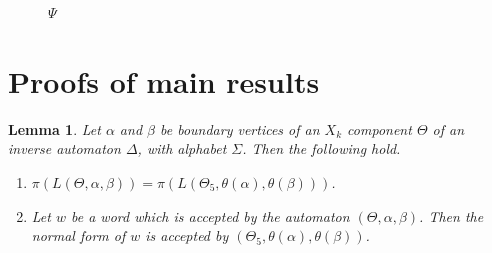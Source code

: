 \documentclass[a4paper,12pt]{article}
\renewcommand{\a}{\alpha }
\renewcommand{\b}{\beta }
\newcommand{\D}{\Delta }
\newcommand{\T}{\Theta }
\renewcommand{\S}{\Sigma }
\newtheorem{lemma}[theorem]{Lemma}
\numberwithin{equation}{section}
\numberwithin{figure}{section}
\newcommand{\be}{\begin{enumerate}}
\newcommand{\ee}{\end{enumerate}}
\begin{document}
\begin{figure}
\begin{center}
\caption{$\Psi$}
\label{fig:out}
\end{center}
\end{figure}
\section{Proofs of main results}
\begin{lemma}\label{lem:nfcomp}
Let $\a$ and $\b$ be boundary vertices of  an $X_k$ component $\T$ of
an inverse automaton $\D$, with alphabet $\S$. Then   the following hold.
\be
\item\label{it:nfcomp1}
  $\pi(L(\T,\a,\b))=\pi(L(\T_5,\theta(\a),\theta(\b)))$.
\item\label{it:nfcomp2} Let $w$ be a word
 which is accepted by the automaton $(\T, \a, \b)$. Then the
normal form of $w$ is accepted by $(\T_5, \theta(\a), \theta(\b))$.
\ee
\end{lemma}
\end{document}
